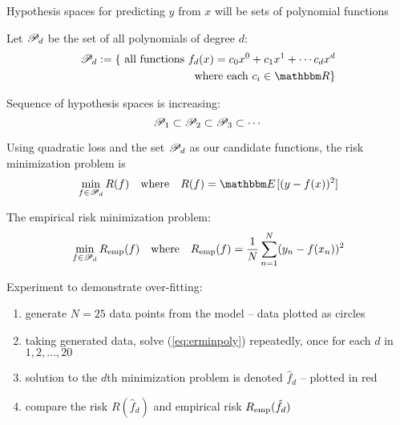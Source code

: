 \begin{frame}

    \vspace{2em}
    Hypothesis spaces for predicting $y$ from $x$ will be sets of polynomial
    functions
    
    \vspace{.7em}
    Let $\mathscr P_d$ be the set of all polynomials of
    degree $d$:
    \begin{align*}
        \pP_d := \{ \text{ all functions } f_d(x) = c_0 x^0 + c_1 x^1 + \cdots c_d
        x^d \\ \text{ where each } c_i \in \RR \}
    \end{align*}
    
    Sequence of hypothesis spaces is increasing:
    \begin{equation*}
        \mathscr P_1 \subset \mathscr P_2 \subset \mathscr P_3 \subset \cdots
    \end{equation*}
    
\end{frame}

\begin{frame}
    
    \vspace{2em}
    Using quadratic loss and the
    set $\mathscr P_d$ as our candidate functions, the risk minimization problem is
    \begin{equation*}
        \label{eq:rminpoly}
        \min_{f \in \pP_d} R(f) 
        \quad \text{where} \quad 
        R(f) = \EE[ (y - f(x))^2 ]
    \end{equation*}
    
    The empirical risk minimization problem: 
    \begin{equation}
        \label{eq:erminpoly}
        \min_{f \in \mathscr P_d} R_{{\rm emp}}(f) 
        \quad \text{where} \quad 
        R_{{\rm emp}}(f) = \frac{1}{N} \sum_{n=1}^N (y_n - f(x_n))^2
    \end{equation}
\end{frame}

\begin{frame}

    \vspace{2em}
    Experiment to demonstrate over-fitting: 
    \begin{enumerate}
        \item generate
    $N=25$ data points from the model -- data plotted as circles
        \item taking generated data, solve (\ref{eq:erminpoly}) repeatedly, 
        once for each $d$ in $1,2,\ldots,20$
        \item solution to the $d$th minimization problem is denoted $\hat f_d$ -- plotted in red
        \item compare the risk
    $R(\hat f_d)$ and empirical risk $R_{{\rm emp}}(\hat f_d)$
    \end{enumerate}
    
\end{frame}

